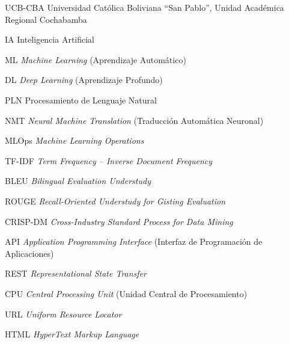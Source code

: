 
%
%
            {UCB-CBA}  %
            {Universidad Católica Boliviana ``San Pablo'', Unidad Académica Regional Cochabamba} %

%
%

            {IA}
            {Inteligencia Artificial}

            {ML}
            {\textit{Machine Learning} (Aprendizaje Automático)}

            {DL}
            {\textit{Deep Learning} (Aprendizaje Profundo)}

            {PLN}
            {Procesamiento de Lenguaje Natural}

            {NMT}
            {\textit{Neural Machine Translation} (Traducción Automática Neuronal)}

            {MLOps}
            {\textit{Machine Learning Operations}}

            {TF-IDF}
            {\textit{Term Frequency -- Inverse Document Frequency}}

            {BLEU}
            {\textit{Bilingual Evaluation Understudy}}

            {ROUGE}
            {\textit{Recall-Oriented Understudy for Gisting Evaluation}}

            {CRISP-DM}
            {\textit{Cross-Industry Standard Process for Data Mining}}

            {API}
            {\textit{Application Programming Interface} (Interfaz de Programación de Aplicaciones)}

            {REST}
            {\textit{Representational State Transfer}}

            {CPU}
            {\textit{Central Processing Unit} (Unidad Central de Procesamiento)}

            {URL}
            {\textit{Uniform Resource Locator}}

            {HTML}
            {\textit{HyperText Markup Language}}
